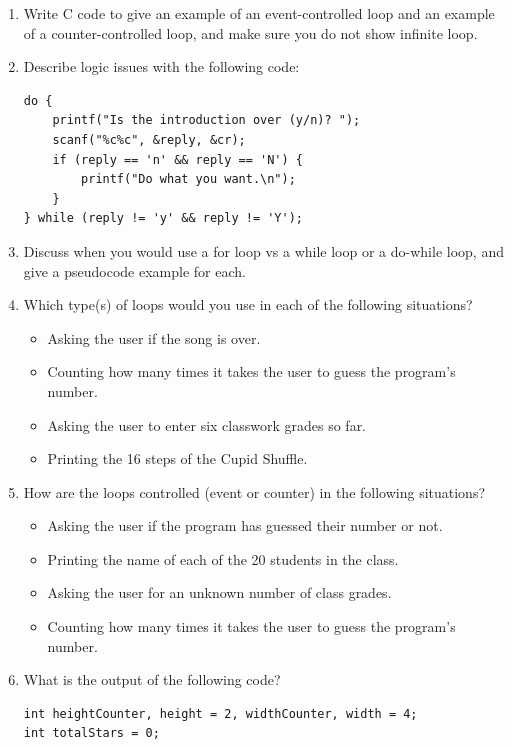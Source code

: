 \documentclass[letter,11pt]{article}
\begin{document}
\begin{enumerate}
    \item Write C code to give an example of an event-controlled loop and an example of a counter-controlled loop, and make sure you do not show infinite loop.
    
    \item Describe logic issues with the following code:
\begin{verbatim}
do {
    printf("Is the introduction over (y/n)? ");
    scanf("%c%c", &reply, &cr);
    if (reply == 'n' && reply == 'N') {
        printf("Do what you want.\n");
    }
} while (reply != 'y' && reply != 'Y');
\end{verbatim}

    \item Discuss when you would use a for loop vs a while loop or a do-while loop, and give a pseudocode example for each.
    
    \item Which type(s) of loops would you use in each of the following situations?
    \begin{itemize}
        \item Asking the user if the song is over.
        \item Counting how many times it takes the user to guess the program's number.
        \item Asking the user to enter six classwork grades so far.
        \item Printing the 16 steps of the Cupid Shuffle.
    \end{itemize}
    
    \item How are the loops controlled (event or counter) in the following situations?
    \begin{itemize}
        \item Asking the user if the program has guessed their number or not.
        \item Printing the name of each of the 20 students in the class.
        \item Asking the user for an unknown number of class grades.
        \item Counting how many times it takes the user to guess the program's number.
    \end{itemize}
    
    \item What is the output of the following code?
    \begin{verbatim}
int heightCounter, height = 2, widthCounter, width = 4;
int totalStars = 0;


\end{verbatim}
\end{enumerate}
\end{document}
